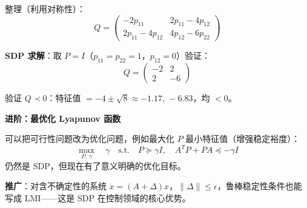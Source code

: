 \documentclass[12pt, a4paper]{ctexart}
\begin{document}
\begin{blackboard}
整理（利用对称性）：
\[
Q = \begin{pmatrix} -2p_{11} & 2p_{11} - 4p_{12} \\ 2p_{11} - 4p_{12} & 4p_{12} - 6p_{22} \end{pmatrix}
\]

\textbf{SDP 求解}：取 $P = I$（$p_{11}=p_{22}=1$，$p_{12}=0$）验证：
\[
Q = \begin{pmatrix} -2 & 2 \\ 2 & -6 \end{pmatrix}
\]

验证 $Q \prec 0$：特征值 $= -4 \pm \sqrt{8} \approx -1.17,\, -6.83$，均 $< 0$。\checkmark

\textbf{进阶：最优化 Lyapunov 函数}

可以把可行性问题改为优化问题，例如最大化 $P$ 最小特征值（增强稳定裕度）：
\[
\max_{P,\,\gamma} \quad \gamma
\quad \text{s.t.} \quad P \succeq \gamma I, \quad A^TP + PA \preceq -\gamma I
\]
仍然是 SDP，但现在有了意义明确的优化目标。

\textbf{推广}：对含不确定性的系统 $\dot{x} = (A + \Delta)x$，$\|\Delta\| \leq \epsilon$，鲁棒稳定性条件也能写成 LMI——这是 SDP 在控制领域的核心优势。

\end{blackboard}
\end{document}
